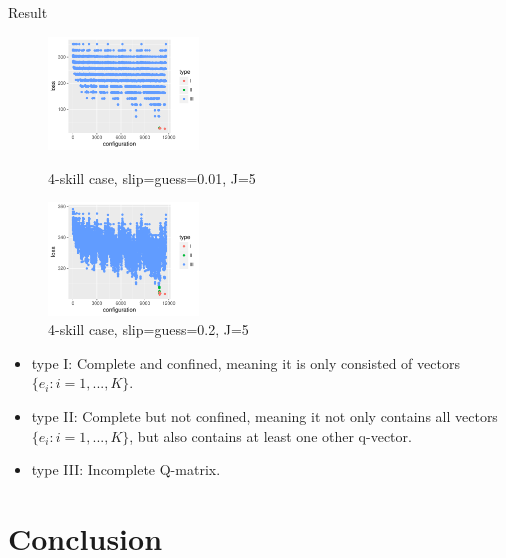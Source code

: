\documentclass[handout]{beamer}
\begin{document}
\begin{frame}{Result}
	\begin{figure}
		\begin{minipage}[b]{0.45\linewidth}
			\centering
			\includegraphics[width=4cm, height=3cm]{Figures/Skill4LossBestConfig_theta001_J5.pdf}
			\caption{4-skill case, slip=guess=0.01, J=5}
			\label{fig:Config-5}
		\end{minipage}
		\hfill
	    \begin{minipage}[b]{0.45\linewidth}
	    	\centering
			\includegraphics[width=4cm, height=3cm]{Figures/Skill4LossBestConfig_theta02_J5.pdf}
			\caption{4-skill case, slip=guess=0.2, J=5}
			\label{fig:Config-6}
	    \end{minipage}
	\end{figure}
	\begin{itemize}
\item type I: Complete and confined, meaning it is only consisted of vectors $\{e_{i}:i=1,...,K\}$.
\item type II: Complete but not confined, meaning it not only contains all vectors $\{e_{i}:i=1,...,K\}$, but also contains at least one other q-vector.
\item type III: Incomplete Q-matrix.
\end{itemize}
\end{frame}


\section[Conclusion]{Conclusion}
\end{document}

